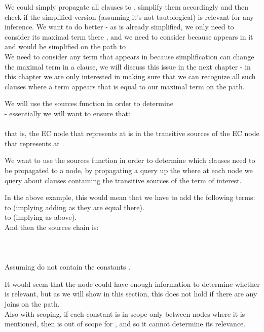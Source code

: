 \begin{itemize}
We could simply propagate all clauses to , simplify them accordingly and then check if the simplified version (assuming it's not tautological) is relevant for any inference. We want to do better - as  is already simplified, we only need to consider its maximal term there , and we need to consider  because  appears in it and would be simplified on the path to .\\
We need to consider any term that appears in  because simplification can change the maximal term in a clause, 
we will discuss this issue in the next chapter - in this chapter we are only interested in making sure that we can recognize 
all such clauses  where a term appears that is equal to our maximal term on the path.

We will use the sources function in order to determine \\
 - essentially we will want to ensure that:\\
\\
that is, the EC node that represents  at  is in the transitive sources of the EC node that represents 
 at .

We want to use the sources function in order to determine which clauses need to be propagated to a node, 
by propagating a query up the \cfg where at each node we query about clauses containing the transitive sources of the term of interest.

In the above example, this would mean that we have to add the following terms:\\
 to  (implying adding  as they are equal there).\\
 to  (implying  as above).\\
And then the sources chain is:\\
 \\
 \\
 \\
Assuming  do not contain the constants .

It would seem that the node  could have enough information to determine whether  is relevant, 
but as we will show in this section, this does not hold if there are any joins on the path.\\
Also with scoping, if each constant is in scope only between nodes where it is mentioned, 
then  is out of scope for , and so it cannot determine its relevance.



\end{itemize}
